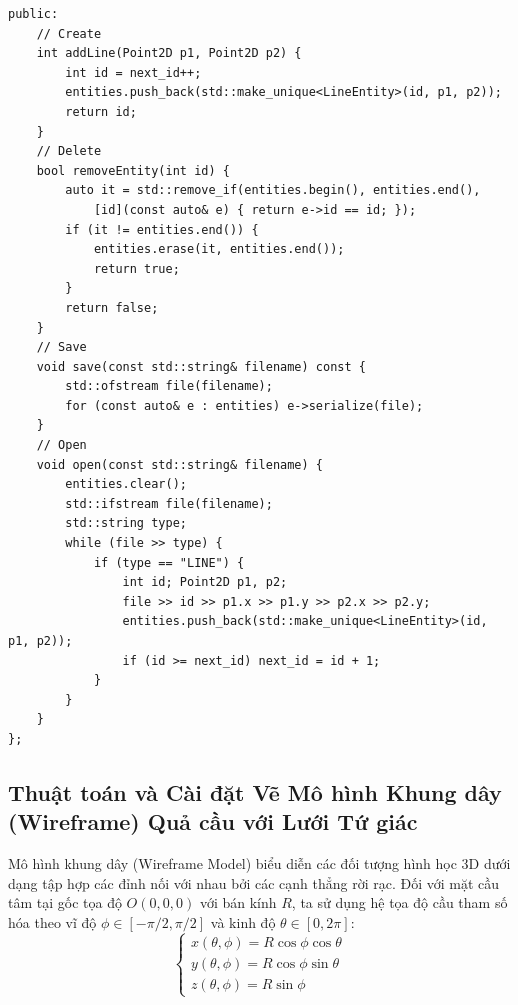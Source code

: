 \begin{verbatim}
public:
    // Create
    int addLine(Point2D p1, Point2D p2) {
        int id = next_id++;
        entities.push_back(std::make_unique<LineEntity>(id, p1, p2));
        return id;
    }
    // Delete
    bool removeEntity(int id) {
        auto it = std::remove_if(entities.begin(), entities.end(),
            [id](const auto& e) { return e->id == id; });
        if (it != entities.end()) {
            entities.erase(it, entities.end());
            return true;
        }
        return false;
    }
    // Save
    void save(const std::string& filename) const {
        std::ofstream file(filename);
        for (const auto& e : entities) e->serialize(file);
    }
    // Open
    void open(const std::string& filename) {
        entities.clear();
        std::ifstream file(filename);
        std::string type;
        while (file >> type) {
            if (type == "LINE") {
                int id; Point2D p1, p2;
                file >> id >> p1.x >> p1.y >> p2.x >> p2.y;
                entities.push_back(std::make_unique<LineEntity>(id, p1, p2));
                if (id >= next_id) next_id = id + 1;
            }
        }
    }
};
\end{verbatim}

\subsection{Thuật toán và Cài đặt Vẽ Mô hình Khung dây (Wireframe) Quả cầu với Lưới Tứ giác}
\label{subsec:wireframe_sphere}

Mô hình khung dây (Wireframe Model) biểu diễn các đối tượng hình học 3D dưới dạng tập hợp các đỉnh nối với nhau bởi các cạnh thẳng rời rạc. Đối với mặt cầu tâm tại gốc tọa độ $O(0, 0, 0)$ với bán kính $R$, ta sử dụng hệ tọa độ cầu tham số hóa theo vĩ độ $\phi \in [-\pi/2, \pi/2]$ và kinh độ $\theta \in [0, 2\pi]$:
\begin{equation}
\label{eq:sphere_parametric}
\begin{cases}
x(\theta, \phi) = R \cos\phi \cos\theta \\
y(\theta, \phi) = R \cos\phi \sin\theta \\
z(\theta, \phi) = R \sin\phi
\end{cases}
\end{equation}

